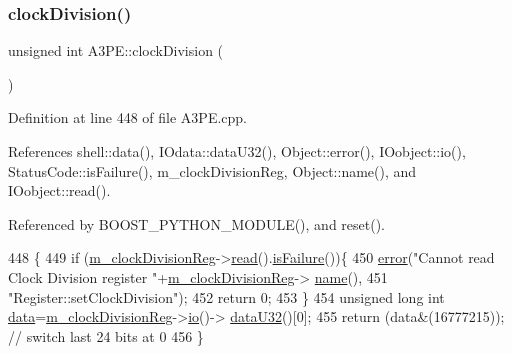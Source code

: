 \subsubsection{\texorpdfstring{clock\+Division()}{clockDivision()}}
{\footnotesize\ttfamily unsigned int A3\+P\+E\+::clock\+Division (\begin{DoxyParamCaption}{ }\end{DoxyParamCaption})}



Definition at line 448 of file A3\+P\+E.\+cpp.



References shell\+::data(), I\+Odata\+::data\+U32(), Object\+::error(), I\+Oobject\+::io(), Status\+Code\+::is\+Failure(), m\+\_\+clock\+Division\+Reg, Object\+::name(), and I\+Oobject\+::read().



Referenced by B\+O\+O\+S\+T\+\_\+\+P\+Y\+T\+H\+O\+N\+\_\+\+M\+O\+D\+U\+L\+E(), and reset().


\begin{DoxyCode}
448                                 \{
449   \textcolor{keywordflow}{if} (\hyperlink{classA3PE_ae1f4c24a99c2e6ae944a080f429cc155}{m\_clockDivisionReg}->\hyperlink{classIOobject_aa07610c11963b1db6710e3c76ceea456}{read}().\hyperlink{classStatusCode_a5dd22dc6eb2c52fc4cabc58f6dea2eb7}{isFailure}())\{
450     \hyperlink{classObject_a204a95f57818c0f811933917a30eff45}{error}(\textcolor{stringliteral}{"Cannot read Clock Division register "}+\hyperlink{classA3PE_ae1f4c24a99c2e6ae944a080f429cc155}{m\_clockDivisionReg}->
      \hyperlink{classObject_a300f4c05dd468c7bb8b3c968868443c1}{name}(),
451         \textcolor{stringliteral}{"Register::setClockDivision"});
452     \textcolor{keywordflow}{return} 0;
453   \}
454   \textcolor{keywordtype}{unsigned} \textcolor{keywordtype}{long} \textcolor{keywordtype}{int} \hyperlink{namespaceshell_a5ea2525995cedc3efd69ea8a7f034d1e}{data}=\hyperlink{classA3PE_ae1f4c24a99c2e6ae944a080f429cc155}{m\_clockDivisionReg}->\hyperlink{classIOobject_af04fb94137c3d86849f478ac5afab5d1}{io}()->
      \hyperlink{classIOdata_ab0e3cd09f46c1c3712f797116f6da074}{dataU32}()[0];
455   \textcolor{keywordflow}{return} (data&(16777215)); \textcolor{comment}{// switch last 24 bits at 0}
456 \}
\end{DoxyCode}
\mbox{\label{classA3PE_a10cf30ff852d7580ba94dbee0c48e0d5}} 
